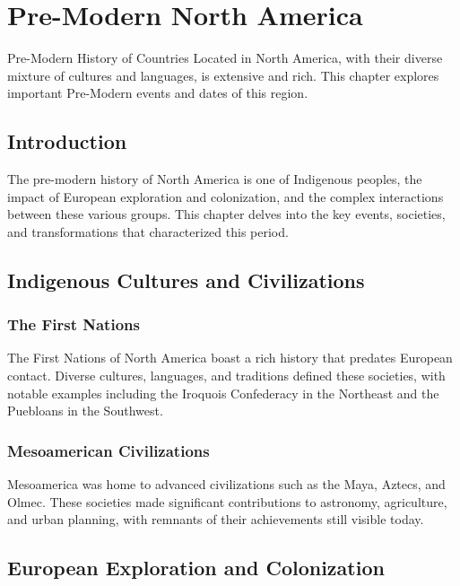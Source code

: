 \documentclass{book}
\begin{document}
\chapter{Pre-Modern North America}
\label{ch:pre-modern-history-north-america}

Pre-Modern History of Countries Located in North America, with their diverse mixture of cultures and languages, is extensive and rich. This chapter explores important Pre-Modern events and dates of this region.

\section{Introduction}
\label{sec:introduction-north-america}
The pre-modern history of North America is one of Indigenous peoples, the impact of European exploration and colonization, and the complex interactions between these various groups. This chapter delves into the key events, societies, and transformations that characterized this period.

\section{Indigenous Cultures and Civilizations}
\label{sec:indigenous-cultures}

\subsection{The First Nations}
The First Nations of North America boast a rich history that predates European contact. Diverse cultures, languages, and traditions defined these societies, with notable examples including the Iroquois Confederacy in the Northeast and the Puebloans in the Southwest.

\subsection{Mesoamerican Civilizations}
Mesoamerica was home to advanced civilizations such as the Maya, Aztecs, and Olmec. These societies made significant contributions to astronomy, agriculture, and urban planning, with remnants of their achievements still visible today.

\section{European Exploration and Colonization}
\label{sec:european-exploration-colonization}
\end{document}

